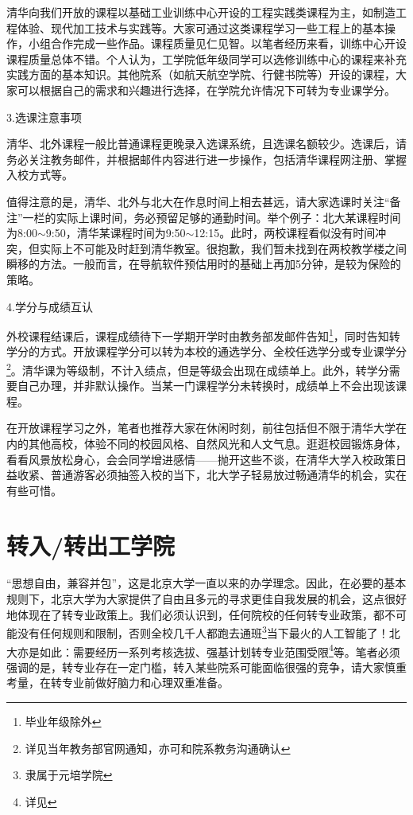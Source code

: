 \documentclass[11pt,oneside]{book}
\begin{document}
清华向我们开放的课程以基础工业训练中心开设的工程实践类课程为主，如制造工程体验、现代加工技术与实践等。大家可通过这类课程学习一些工程上的基本操作，小组合作完成一些作品。课程质量见仁见智。以笔者经历来看，训练中心开设课程质量总体不错。个人认为，工学院低年级同学可以选修训练中心的课程来补充实践方面的基本知识。其他院系（如航天航空学院、行健书院等）开设的课程，大家可以根据自己的需求和兴趣进行选择，在学院允许情况下可转为专业课学分。

\vspace{20pt}

3.选课注意事项

清华、北外课程一般比普通课程更晚录入选课系统，且选课名额较少。选课后，请务必关注教务邮件，并根据邮件内容进行进一步操作，包括清华课程网注册、掌握入校方式等。

值得注意的是，清华、北外与北大在作息时间上相去甚远，请大家选课时关注“备注”一栏的实际上课时间，务必预留足够的通勤时间。举个例子：北大某课程时间为8:00$\sim$9:50，清华某课程时间为9:50$\sim$12:15。此时，两校课程看似没有时间冲突，但实际上不可能及时赶到清华教室。很抱歉，我们暂未找到在两校教学楼之间瞬移的方法。一般而言，在导航软件预估用时的基础上再加5分钟，是较为保险的策略。

\vspace{20pt}

4.学分与成绩互认

外校课程结课后，课程成绩待下一学期开学时由教务部发邮件告知\footnote{毕业年级除外}，同时告知转学分的方式。开放课程学分可以转为本校的通选学分、全校任选学分或专业课学分\footnote{详见当年教务部官网通知，亦可和院系教务沟通确认}。清华课为等级制，不计入绩点，但是等级会出现在成绩单上。此外，转学分需要自己办理，并非默认操作。当某一门课程学分未转换时，成绩单上不会出现该课程。

\vspace{20pt}

在开放课程学习之外，笔者也推荐大家在休闲时刻，前往包括但不限于清华大学在内的其他高校，体验不同的校园风格、自然风光和人文气息。逛逛校园锻炼身体，看看风景放松身心，会会同学增进感情——抛开这些不谈，在清华大学入校政策日益收紧、普通游客必须抽签入校的当下，北大学子轻易放过畅通清华的机会，实在有些可惜。

\section{转入/转出工学院}
“思想自由，兼容并包”，这是北京大学一直以来的办学理念。因此，在必要的基本规则下，北京大学为大家提供了自由且多元的寻求更佳自我发展的机会，这点很好地体现在了转专业政策上。我们必须认识到，任何院校的任何转专业政策，都不可能没有任何规则和限制，否则全校几千人都跑去通班\footnote{隶属于元培学院}当下最火的人工智能了！北大亦是如此：需要经历一系列考核选拔、强基计划转专业范围受限\footnote{详见}等。笔者必须强调的是，转专业存在一定门槛，转入某些院系可能面临很强的竞争，请大家慎重考量，在转专业前做好脑力和心理双重准备。
\end{document}
